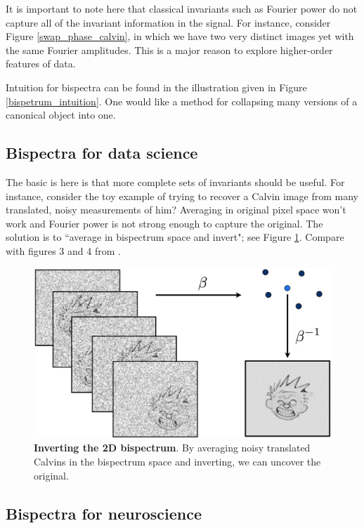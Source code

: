 \documentclass[letterpaper, 10pt]{article}
\theoremstyle{definition}
\begin{document}
It is important to note here that classical invariants such as Fourier power do not capture all of the invariant information in the signal.  For instance, consider Figure \ref{swap_phase_calvin}, in which we have two very distinct images yet with the same Fourier amplitudes.
This is a major reason to explore higher-order features of data.

Intuition for bispectra can be found in the illustration given in Figure \ref{bispetrum_intuition}.  One would like a method for collapsing many versions of a canonical object into one.  

\subsection{Bispectra for data science}

The basic is here is that more complete sets of invariants should be useful.  For instance, consider the toy example of trying to recover a Calvin image from many translated, noisy measurements of him?  Averaging in original pixel space won't work and Fourier power is not strong enough to capture the original.  The solution is to ``average in bispectrum space and invert"; see Figure \ref{bispetrum_invert_calvin}.
Compare with figures 3 and 4 from \cite{sadler89}.

\begin{figure}
\begin{center}
\includegraphics[width=.9 \linewidth]{figs/calvin_inv_bispectrum.png} 
\caption{\textbf{Inverting the 2D bispectrum}. By averaging noisy translated Calvins in the bispectrum space and inverting, we can uncover the original.}
\label{bispetrum_invert_calvin}
\end{center}
\end{figure}

\subsection{Bispectra for neuroscience}
\end{document}
